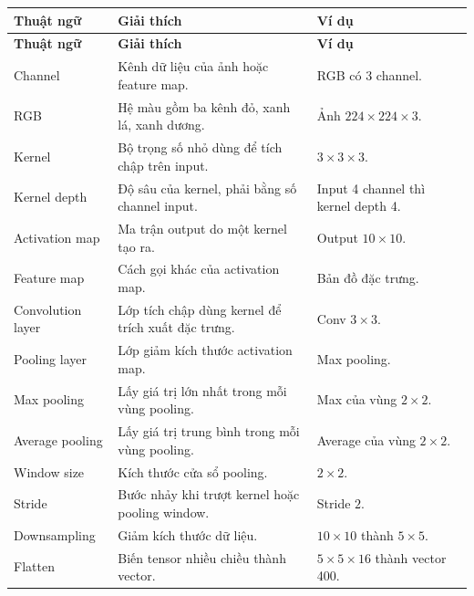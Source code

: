 \small
\begin{longtable}{p{}p{}p{}}
\toprule
\textbf{Thuật ngữ} & \textbf{Giải thích} & \textbf{Ví dụ} \\
\midrule
\endfirsthead

\toprule
\textbf{Thuật ngữ} & \textbf{Giải thích} & \textbf{Ví dụ} \\
\midrule
\endhead

Channel & Kênh dữ liệu của ảnh hoặc feature map. & RGB có 3 channel. \\

RGB & Hệ màu gồm ba kênh đỏ, xanh lá, xanh dương. & Ảnh $224\times224\times3$. \\

Kernel & Bộ trọng số nhỏ dùng để tích chập trên input. & $3\times3\times3$. \\

Kernel depth & Độ sâu của kernel, phải bằng số channel input. & Input 4 channel thì kernel depth 4. \\

Activation map & Ma trận output do một kernel tạo ra. & Output $10\times10$. \\

Feature map & Cách gọi khác của activation map. & Bản đồ đặc trưng. \\

Convolution layer & Lớp tích chập dùng kernel để trích xuất đặc trưng. & Conv $3\times3$. \\

Pooling layer & Lớp giảm kích thước activation map. & Max pooling. \\

Max pooling & Lấy giá trị lớn nhất trong mỗi vùng pooling. & Max của vùng $2\times2$. \\

Average pooling & Lấy giá trị trung bình trong mỗi vùng pooling. & Average của vùng $2\times2$. \\

Window size & Kích thước cửa sổ pooling. & $2\times2$. \\

Stride & Bước nhảy khi trượt kernel hoặc pooling window. & Stride $2$. \\

Downsampling & Giảm kích thước dữ liệu. & $10\times10$ thành $5\times5$. \\

Flatten & Biến tensor nhiều chiều thành vector. & $5\times5\times16$ thành vector 400. \\


\end{longtable}
